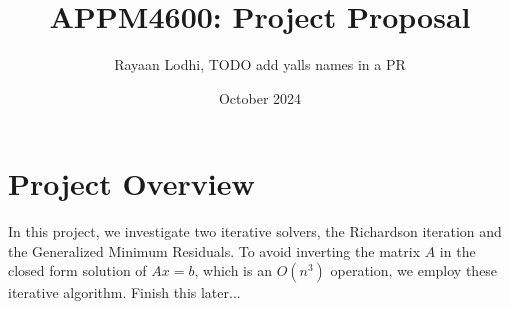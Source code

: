 \documentclass{article}
\title{APPM4600: Project Proposal}
\author{Rayaan Lodhi, TODO add yalls names in a PR}
\date{October 2024}
\begin{document}
\maketitle

\section{Project Overview}
In this project, we investigate two iterative solvers, the Richardson iteration and the Generalized Minimum Residuals. To avoid inverting the matrix $A$ in the closed form solution of $Ax = b$, which is an  $O(n^3)$ operation, we employ these iterative algorithm. Finish this later...
\end{document}
